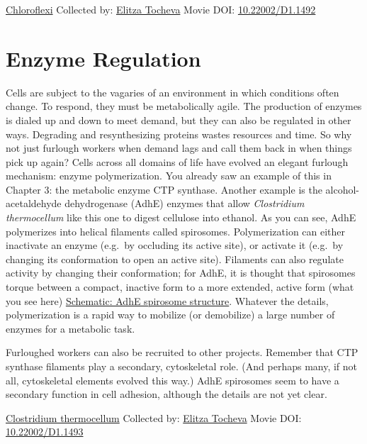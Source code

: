 \documentclass[]{tufte-book}
\begin{document}
\hypertarget{htmlwidget-5bd34202740908747d69}{}

\label{fig:4-4}\protect\hyperlink{tree}{Chloroflexi} Collected by: \protect\hyperlink{elitza_tocheva}{Elitza Tocheva} Movie DOI: \href{https://doi.org/10.22002/D1.1492}{10.22002/D1.1492}

\hypertarget{enzyme-regulation}{%
\section{Enzyme Regulation}\label{enzyme-regulation}}

Cells are subject to the vagaries of an environment in which conditions often change. To respond, they must be metabolically agile. The production of enzymes is dialed up and down to meet demand, but they can also be regulated in other ways. Degrading and resynthesizing proteins wastes resources and time. So why not just furlough workers when demand lags and call them back in when things pick up again? Cells across all domains of life have evolved an elegant furlough mechanism: enzyme polymerization. You already saw an example of this in Chapter 3: the metabolic enzyme CTP synthase. Another example is the alcohol-acetaldehyde dehydrogenase (AdhE) enzymes that allow \emph{Clostridium thermocellum} like this one to digest cellulose into ethanol. As you can see, AdhE polymerizes into helical filaments called spirosomes. Polymerization can either inactivate an enzyme (e.g.~by occluding its active site), or activate it (e.g.~by changing its conformation to open an active site). Filaments can also regulate activity by changing their conformation; for AdhE, it is thought that spirosomes torque between a compact, inactive form to a more extended, active form (what you see here) \protect\hyperlink{AdhE_spirosome_structure}{Schematic: AdhE spirosome structure}. Whatever the details, polymerization is a rapid way to mobilize (or demobilize) a large number of enzymes for a metabolic task.

Furloughed workers can also be recruited to other projects. Remember that CTP synthase filaments play a secondary, cytoskeletal role. (And perhaps many, if not all, cytoskeletal elements evolved this way.) AdhE spirosomes seem to have a secondary function in cell adhesion, although the details are not yet clear.



\hypertarget{htmlwidget-0d56633b6c5dc420e561}{}

\label{fig:4-5}\protect\hyperlink{tree}{Clostridium thermocellum} Collected by: \protect\hyperlink{elitza_tocheva}{Elitza Tocheva} Movie DOI: \href{https://doi.org/10.22002/D1.1493}{10.22002/D1.1493}
\end{document}
